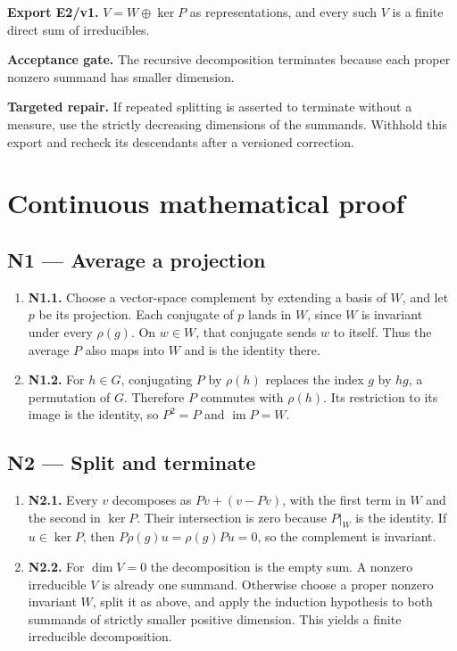 \documentclass[preprint,12pt,aps,pra,showkeys,amsmath,amssymb,superscriptaddress,floatfix]{revtex4-2}
\theoremstyle{definition}
\theoremstyle{remark}
\newcommand{\field}[2]{\par\smallskip\noindent\textbf{#1.} #2\par}
\begin{document}
\field{Export E2/v1}{\(V=W\oplus\ker P\) as representations, and every such \(V\) is a finite
direct sum of irreducibles.}

\field{Acceptance gate}{The recursive decomposition terminates because each proper nonzero
summand has smaller dimension.}

\field{Targeted repair}{If repeated splitting is asserted to terminate without a measure, use
the strictly decreasing dimensions of the summands. Withhold this export
and recheck its descendants after a versioned correction.}

\endgroup\clearpage\section{Continuous mathematical proof}\label{sec:proof}

\subsection{N1 --- Average a projection}\label{n1-average-a-projection}

\begin{enumerate}
\def\labelenumi{\arabic{enumi}.}
\item
  \textbf{N1.1.} Choose a vector-space complement by extending a basis
  of \(W\), and let \(p\) be its projection. Each conjugate of \(p\)
  lands in \(W\), since \(W\) is invariant under every \(\rho(g)\). On
  \(w\in W\), that conjugate sends \(w\) to itself. Thus the average
  \(P\) also maps into \(W\) and is the identity there.
\item
  \textbf{N1.2.} For \(h\in G\), conjugating \(P\) by \(\rho(h)\)
  replaces the index \(g\) by \(hg\), a permutation of \(G\). Therefore
  \(P\) commutes with \(\rho(h)\). Its restriction to its image is the
  identity, so \(P^2=P\) and \(\operatorname{im}P=W\).
\end{enumerate}

\subsection{N2 --- Split and terminate}\label{n2-split-and-terminate}

\begin{enumerate}
\def\labelenumi{\arabic{enumi}.}
\item
  \textbf{N2.1.} Every \(v\) decomposes as \(Pv+(v-Pv)\), with the first
  term in \(W\) and the second in \(\ker P\). Their intersection is zero
  because \(P|_W\) is the identity. If \(u\in\ker P\), then
  \(P\rho(g)u=\rho(g)Pu=0\), so the complement is invariant.
\item
  \textbf{N2.2.} For \(\dim V=0\) the decomposition is the empty sum. A
  nonzero irreducible \(V\) is already one summand. Otherwise choose a
  proper nonzero invariant \(W\), split it as above, and apply the
  induction hypothesis to both summands of strictly smaller positive
  dimension. This yields a finite irreducible decomposition.
\end{enumerate}
\end{document}
